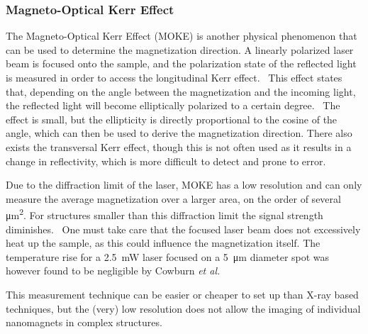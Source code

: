 \documentclass[11pt,a4paper,english]{article}
\begin{document}
\subsubsection{Magneto-Optical Kerr Effect}
The Magneto-Optical Kerr Effect (MOKE) is another physical phenomenon that can be used to determine the magnetization direction. A linearly polarized laser beam is focused onto the sample, and the polarization state of the reflected light is measured in order to access the longitudinal Kerr effect.~\cite{MQCA_RoomTemp} This effect states that, depending on the angle between the magnetization and the incoming light, the reflected light will become elliptically polarized to a certain degree.~\cite{KerrFaraday_book} The effect is small, but the ellipticity is directly proportional to the cosine of the angle, which can then be used to derive the magnetization direction. There also exists the transversal Kerr effect, though this is not often used as it results in a change in reflectivity, which is more difficult to detect and prone to error. \par
Due to the diffraction limit of the laser, MOKE has a low resolution and can only measure the average magnetization over a larger area, on the order of several \si{\micro\metre\squared}. For structures smaller than this diffraction limit the signal strength diminishes.~\cite{Probing_MagnetoOptics} One must take care that the focused laser beam does not excessively heat up the sample, as this could influence the magnetization itself. The temperature rise for a \SI{2.5}{\milli\watt} laser focused on a \SI{5}{\micro\metre} diameter spot was however found to be negligible by Cowburn \textit{et al.}~\cite{Probing_MagnetoOptics} \par
This measurement technique can be easier or cheaper to set up than X-ray based techniques, but the (very) low resolution does not allow the imaging of individual nanomagnets in complex structures.

\clearpage
\end{document}
